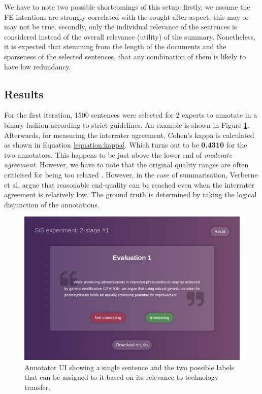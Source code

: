 We have to note two possible shortcomings of this setup: firstly, we assume the FE intentions are strongly correlated with the sought-after aspect, this may or may not be true. secondly, only the individual relevance of the sentences is considered instead of the overall relevance (utility) of the summary. Nonetheless, it is expected that stemming from the length of the documents and the sparseness of the selected sentences, that any combination of them is likely to have low redundancy.

\subsection{Results}

For the first iteration, 1500 sentences were selected for 2 experts to annotate in a binary fashion according to strict guidelines. An example is shown in Figure \ref{fig:annotator}. Afterwards, for measuring the interrater agreement, Cohen's kappa \cite{cohen1960coefficient} is calculated as shown in Equation \ref{equation:kappa}. Which turns out to be \textbf{0.4310} for the two annotators. This happens to be just above the lower end of \textit{moderate agreement}. However, we have to note that the original quality ranges are often criticised for being too relaxed \cite{mchugh2012interrater}. However, in the case of summarisation, Verberne et al. \cite{verberne2018creating} argue that reasonable end-quality can be reached even when the interrater agreement is relatively low. The ground truth is determined by taking the logical disjunction of the annotations.

\begin{figure}
    \centering
    \includegraphics[width=0.75\linewidth]{figures/annotator.png}
    \captionsetup{width=.9\linewidth}
    \caption{Annotator UI showing a single sentence and the two possible labels that can be assigned to it based on its relevance to technology transfer.}
    \label{fig:annotator}
\end{figure}

